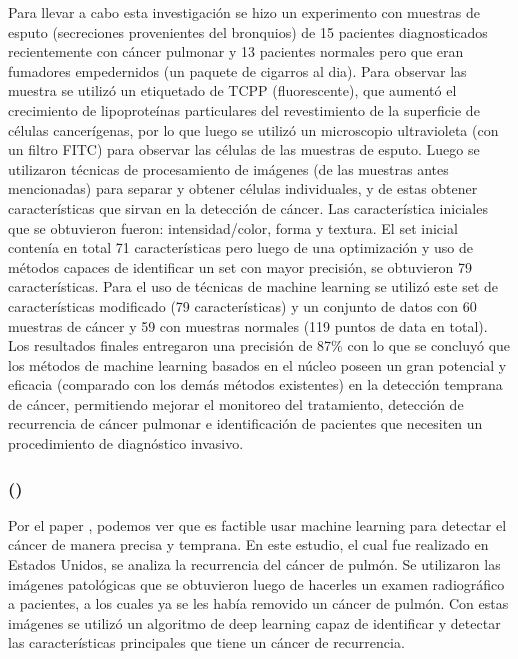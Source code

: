 \documentclass[12pt, letterpaper]{article}
\begin{document}
Para llevar a cabo esta investigación se hizo un experimento con muestras de esputo (secreciones provenientes del bronquios) de 15 pacientes diagnosticados recientemente con cáncer pulmonar y 13 pacientes normales pero que eran fumadores empedernidos (un paquete de cigarros al dia).  Para observar las muestra se utilizó un etiquetado de TCPP (fluorescente), que aumentó el crecimiento de lipoproteínas particulares del revestimiento de la superficie de células cancerígenas, por lo que luego se utilizó un microscopio ultravioleta (con un filtro FITC) para observar las células de las muestras de esputo. Luego se utilizaron técnicas de procesamiento de imágenes (de las muestras antes mencionadas) para separar y obtener células individuales, y de estas obtener características que sirvan en la detección de cáncer. Las característica iniciales que se obtuvieron fueron: intensidad/color, forma y textura. El set inicial contenía en total 71 características pero luego de una optimización y uso de métodos capaces de identificar un set con mayor precisión, se obtuvieron 79 características. Para el uso de técnicas de machine learning se utilizó este set de características modificado (79 características) y un conjunto de datos con 60 muestras de cáncer y 59 con muestras normales (119 puntos de data en total). Los resultados finales entregaron una precisión de 87\% con lo que se concluyó que los métodos de machine learning basados en el núcleo poseen un gran potencial y eficacia (comparado con los demás métodos existentes) en la detección temprana de cáncer, permitiendo mejorar el monitoreo del tratamiento, detección de recurrencia de cáncer pulmonar e identificación de pacientes que necesiten un procedimiento de diagnóstico invasivo.


\newpage

\subsubsection{\texorpdfstring{ (\citeauthor{wangPredictionRecurrenceEarly2017})}{}}

Por el paper \autocite{kancherlaEarlyLungCancer2013}, podemos ver que es factible usar machine learning para detectar el cáncer de manera precisa y temprana. En este estudio, el cual fue realizado en Estados Unidos, se analiza la recurrencia del cáncer de pulmón. Se utilizaron las imágenes patológicas que se obtuvieron luego de hacerles un examen radiográfico a pacientes, a los cuales ya se les había removido un cáncer de pulmón. Con estas imágenes se utilizó un algoritmo de deep learning capaz de identificar y detectar las características principales que tiene un cáncer de recurrencia.
\end{document}
